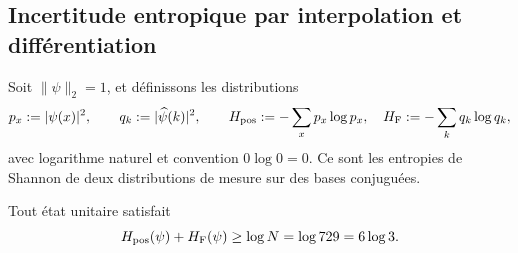 \subsection{Incertitude entropique par interpolation et différentiation}
\label{v:n19:sec:entropia}

Soit \(\|\psi\|_2=1\), et définissons les distributions
\begin{equation}
 p_x:=|\psi(x)|^2,\qquad q_k:=|\widehat\psi(k)|^2,
 \qquad
 H_{\rm pos}:=-\sum_xp_x\log p_x,\quad
 H_{\rm F}:=-\sum_kq_k\log q_k,
 \label{v:n19:eq:entropias-distribucion}
\end{equation}
avec logarithme naturel et convention \(0\log0=0\). Ce sont les entropies de
Shannon de deux distributions de mesure sur des bases conjuguées.

\begin{theorem}
\label{v:n19:thm:entropia}
Tout état unitaire satisfait
\begin{equation}
 H_{\rm pos}(\psi)+H_{\rm F}(\psi)
 \ge\log N=\log729=6\log3.
 \label{v:n19:eq:cota-entropica}
\end{equation}
\end{theorem}
